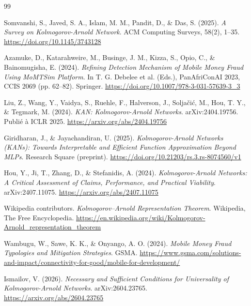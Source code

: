 \documentclass[11pt,a4paper,oneside]{report}
\theoremstyle{definition}
\theoremstyle{remark}
\begin{document}
\begin{thebibliography}{99}

Somvanshi, S., Javed, S. A., Islam, M. M., Pandit, D., \& Das, S. (2025).
\textit{A Survey on Kolmogorov-Arnold Network}.
ACM Computing Surveys, 58(2), 1--35.
\url{https://doi.org/10.1145/3743128}

Azamuke, D., Katarahweire, M., Businge, J. M., Kizza, S., Opio, C., \& Bainomugisha, E. (2024).
\textit{Refining Detection Mechanism of Mobile Money Fraud Using MoMTSim Platform}.
In T. G. Debelee et al. (Eds.), PanAfriConAI 2023, CCIS 2069 (pp. 62--82). Springer.
\url{https://doi.org/10.1007/978-3-031-57639-3_3}

Liu, Z., Wang, Y., Vaidya, S., Ruehle, F., Halverson, J., Soljačić, M., Hou, T. Y., \& Tegmark, M. (2024).
\textit{KAN: Kolmogorov-Arnold Networks}.
arXiv:2404.19756. Publié à ICLR 2025.
\url{https://arxiv.org/abs/2404.19756}

Giridharan, J., \& Jayachandiran, U. (2025).
\textit{Kolmogorov-Arnold Networks (KANs): Towards Interpretable and Efficient Function Approximation Beyond MLPs}.
Research Square (preprint).
\url{https://doi.org/10.21203/rs.3.rs-8074560/v1}

Hou, Y., Ji, T., Zhang, D., \& Stefanidis, A. (2024).
\textit{Kolmogorov-Arnold Networks: A Critical Assessment of Claims, Performance, and Practical Viability}.
arXiv:2407.11075.
\url{https://arxiv.org/abs/2407.11075}

Wikipedia contributors.
\textit{Kolmogorov--Arnold Representation Theorem}.
Wikipedia, The Free Encyclopedia.
\url{https://en.wikipedia.org/wiki/Kolmogorov-Arnold_representation_theorem}

Wambugu, W., Sawe, K. K., \& Onyango, A. O. (2024).
\textit{Mobile Money Fraud Typologies and Mitigation Strategies}.
GSMA.
\url{https://www.gsma.com/solutions-and-impact/connectivity-for-good/mobile-for-development/}

Ismailov, V. (2026).
\textit{Necessary and Sufficient Conditions for Universality of Kolmogorov-Arnold Networks}.
arXiv:2604.23765.
\url{https://arxiv.org/abs/2604.23765}


\end{thebibliography}
\end{document}
